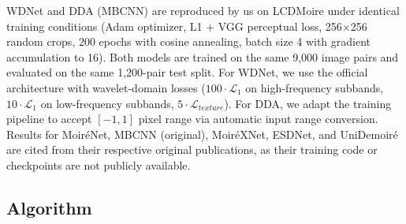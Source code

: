 \documentclass[10pt,twocolumn,letterpaper]{article}
\begin{document}
WDNet and DDA (MBCNN) are reproduced by us on LCDMoire under identical training conditions (Adam optimizer, L1 + VGG perceptual loss, 256$\times$256 random crops, 200 epochs with cosine annealing, batch size 4 with gradient accumulation to 16). Both models are trained on the same 9,000 image pairs and evaluated on the same 1,200-pair test split. For WDNet, we use the official architecture with wavelet-domain losses ($100\cdot\mathcal{L}_1$ on high-frequency subbands, $10\cdot\mathcal{L}_1$ on low-frequency subbands, $5\cdot\mathcal{L}_{texture}$). For DDA, we adapt the training pipeline to accept $[-1,1]$ pixel range via automatic input range conversion. Results for Moir\'{e}Net, MBCNN (original), Moir\'{e}XNet, ESDNet, and UniDemoir\'{e} are cited from their respective original publications, as their training code or checkpoints are not publicly available.

\FloatBarrier
\subsection{Algorithm}
\end{document}

